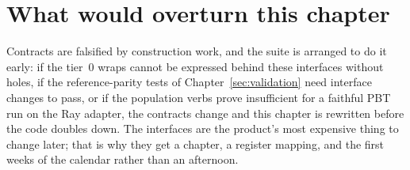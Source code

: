\section{What would overturn this chapter}

Contracts are falsified by construction work, and the suite is
arranged to do it early: if the tier~0 wraps cannot be expressed
behind these interfaces without holes, if the reference-parity tests
of Chapter~\ref{sec:validation} need interface changes to pass, or
if the population verbs prove insufficient for a faithful PBT run
on the Ray adapter, the contracts change and this chapter is
rewritten before the code doubles down. The interfaces are the
product's most expensive thing to change later; that is why they
get a chapter, a register mapping, and the first weeks of the
calendar rather than an afternoon.
